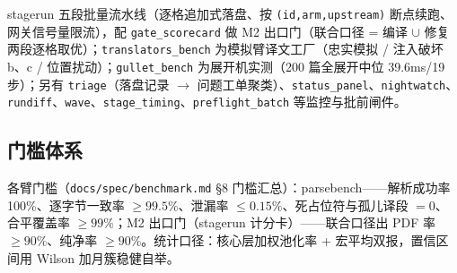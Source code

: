 stagerun 五段批量流水线（逐格追加式落盘、按 \texttt{(id,arm,upstream)} 断点续跑、网关信号量限流），配 \texttt{gate\_scorecard} 做 M2 出口门（联合口径 = 编译 $\cup$ 修复两段逐格取优）；\texttt{translators\_bench} 为模拟臂译文工厂（忠实模拟 / 注入破坏 b、c / 位置扰动）；\texttt{gullet\_bench} 为展开机实测（200 篇全展开中位 39.6ms/19 步）；另有 \texttt{triage}（落盘记录 $\to$ 问题工单聚类）、\texttt{status\_panel}、\texttt{nightwatch}、\texttt{rundiff}、\texttt{wave}、\texttt{stage\_timing}、\texttt{preflight\_batch} 等监控与批前闸件。

\subsection{门槛体系}

各臂门槛（\texttt{docs/spec/benchmark.md} §8 门槛汇总）：parsebench——解析成功率 100\%、逐字节一致率 $\geq 99.5\%$、泄漏率 $\leq 0.15\%$、死占位符与孤儿译段 $=0$、合平覆盖率 $\geq 99\%$；M2 出口门（stagerun 计分卡）——联合口径出 PDF 率 $\geq 90\%$、纯净率 $\geq 90\%$。统计口径：核心层加权池化率 + 宏平均双报，置信区间用 Wilson 加月簇稳健自举。
